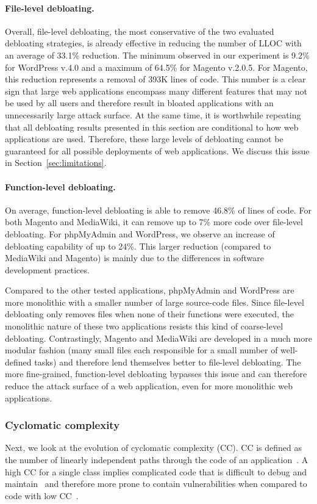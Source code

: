 \paragraph{File-level debloating.}
Overall, file-level debloating, the most conservative of the two evaluated
debloating strategies, is already effective in reducing the number of LLOC with an average of 33.1\% reduction.
The minimum observed in our experiment is 9.2\% for WordPress
v.4.0 and a maximum of 64.5\% for Magento v.2.0.5. For Magento,
this reduction represents a removal of 393K lines of code.
This number is a clear sign that large web applications encompass many
different features that may not be used by all users and therefore result
in bloated applications with an unnecessarily large attack surface. At the same time, it is worthwhile repeating that all debloating results presented in this section are conditional to how web applications are used. Therefore, these large levels of debloating cannot be guaranteed for all possible deployments of web applications. We discuss this issue in Section~\ref{sec:limitations}.

\paragraph{Function-level debloating.}
On average, function-level debloating is able to remove 46.8\% of lines of code.
For both Magento and MediaWiki, it can remove up to
7\% more code over file-level debloating. For phpMyAdmin and WordPress, we observe an
increase of debloating capability of up to 24\%. This
larger reduction (compared to MediaWiki and Magento) is mainly due to
the differences in software development practices.

Compared to the other
tested applications, phpMyAdmin and WordPress are more monolithic with a smaller number of large
source-code files. Since file-level debloating only removes files when none
of their functions were executed, the monolithic nature of these two applications resists
this kind of coarse-level debloating. Contrastingly, Magento and MediaWiki
are developed in a much more modular fashion (many small files each responsible
for a small number of well-defined tasks) and therefore lend themselves better to file-level
debloating. The more fine-grained, function-level debloating bypasses this
issue and can therefore reduce the attack surface of a web application,
even for more monolithic web applications.


\subsubsection{Cyclomatic complexity}
\label{subsubsec:cyclomatic-complexity}
Next, we look at the evolution of cyclomatic complexity (CC). CC is defined as
the number of linearly independent paths through the code of
an application~\cite{mccabe1976complexity}. A high CC for a
single class implies complicated code that is difficult to
debug and maintain~\cite{gill1991cyclomatic} and therefore
more prone to contain vulnerabilities when compared to code with low
CC~\cite{shin2008empirical,kurmus2013attack}.

